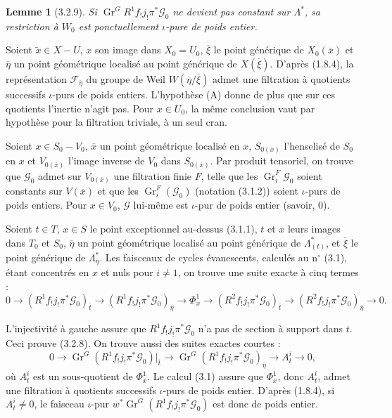 \documentclass[12pt,a4paper]{article}
\theoremstyle{plain}
\newtheorem{lemma}[theorem]{Lemme}
\theoremstyle{definition}
\theoremstyle{remark}
\DeclareMathOperator{\Gr}{Gr}
\begin{document}
\begin{lemma}[3.2.9]
Si $\Gr^G R^1 f_! j_! \pi^* \mathscr{G}_0$ ne devient pas constant sur $\Lambda^*$, sa restriction \`a $W_0$ est ponctuellement $\iota$-pure de poids entier.
\end{lemma}

Soient $\tilde{x} \in X - U$, $x$ son image dans $X_0 = U_0$, $\overline{\xi}$ le point g\'en\'erique de $X_0(\overline{x})$ et $\overline{\eta}$ un point g\'eom\'etrique localis\'e au point g\'en\'erique de $X(\overline{\xi})$. D'apr\`es (1.8.4), la repr\'esentation $\mathscr{F}_{\overline{\eta}}$ du groupe de Weil $W(\overline{\eta}/\overline{\xi})$ admet une filtration \`a quotients successifs $\iota$-purs de poids entiers. L'hypoth\`ese (A) donne de plus que sur ces quotients l'inertie n'agit pas. Pour $x \in U_0$, la m\^eme conclusion vaut par hypoth\`ese pour la filtration triviale, \`a un seul cran.

Soient $x \in S_0 - V_0$, $\overline{x}$ un point g\'eom\'etrique localis\'e en $x$, $S_{0(\overline{x})}$ l'henselis\'e de $S_0$ en $x$ et $V_{0(\overline{x})}$ l'image inverse de $V_0$ dans $S_{0(\overline{x})}$. Par produit tensoriel, on trouve que $\mathscr{G}_0$ admet sur $V_{0(\overline{x})}$ une filtration finie $F$, telle que les $\Gr_i^F \mathscr{G}_0$ soient constants sur $V(\overline{x})$ et que les $\Gr_i^F(\mathscr{G}_0)$ (notation (3.1.2)) soient $\iota$-purs de poids entiers. Pour $x \in V_0$, $\mathscr{G}$ lui-m\^eme est $\iota$-pur de poids entier (savoir, $0$).

Soient $t \in T$, $x \in S$ le point exceptionnel au-dessus (3.1.1), $t$ et $x$ leurs images dans $T_0$ et $S_0$, $\overline{\eta}$ un point g\'eom\'etrique localis\'e au point g\'en\'erique de $\Lambda^*_{(t)}$, et $\overline{\xi}$ le point g\'en\'erique de $\Lambda^*_{\overline{\eta}}$. Les faisceaux de cycles \'evanescents, calcul\'es au n$^\circ$ (3.1), \'etant concentr\'es en $x$ et nuls pour $i \neq 1$, on trouve une suite exacte \`a cinq termes :
\begin{equation}\label{eq:3.2.9.1}
0 \to (R^1 f_! j_! \pi^* \mathscr{G}_0)_{\overline{t}} \to (R^1 f_! j_! \pi^* \mathscr{G}_0)_{\overline{\eta}} \to \Phi^1_x \to (R^2 f_! j_! \pi^* \mathscr{G}_0)_{\overline{t}} \to (R^2 f_! j_! \pi^* \mathscr{G}_0)_{\overline{\eta}} \to 0.
\end{equation}

L'injectivit\'e \`a gauche assure que $R^1 f_! j_! \pi^* \mathscr{G}_0$ n'a pas de section \`a support dans $t$. Ceci prouve (3.2.8). On trouve aussi des suites exactes courtes :
\[ 0 \to \Gr^G(R^1 f_! j_! \pi^* \mathscr{G}_0)|_{\overline{t}} \to \Gr^G(R^1 f_! j_! \pi^* \mathscr{G}_0)_{\overline{\eta}} \to A_t^i \to 0, \]
o\`u $A_t^i$ est un sous-quotient de $\Phi^1_x$. Le calcul (3.1) assure que $\Phi^1_x$, donc $A_t^i$, admet une filtration \`a quotients successifs $\iota$-purs de poids entier. D'apr\`es (1.8.4), si $A_t^i \neq 0$, le faisceau $\iota$-pur $w^* \Gr^G(R^1 f_! j_! \pi^* \mathscr{G}_0)$ est donc de poids entier.
\end{document}
